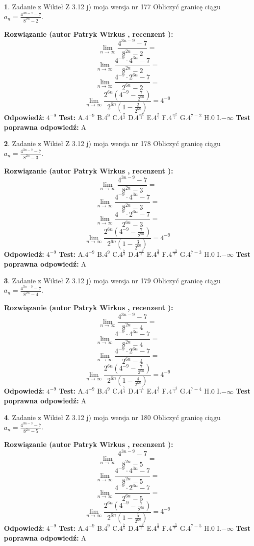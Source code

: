 \documentclass[12pt, a4paper]{article}
\theoremstyle{definition} %
\newtheorem{zad}{}
\newcommand{\zadStart}[1]{\begin{zad}#1\newline}
\newcommand{\zadStop}{\end{zad}}
\newcommand{\rozwStart}[2]{\noindent \textbf{Rozwiązanie (autor #1 , recenzent #2): }\newline}
\newcommand{\rozwStop}{\newline}
\newcommand{\odpStart}{\noindent \textbf{Odpowiedź:}\newline}
\newcommand{\odpStop}{\newline}
\newcommand{\testStart}{\noindent \textbf{Test:}\newline}
\newcommand{\testStop}{\newline}
\newcommand{\kluczStart}{\noindent \textbf{Test poprawna odpowiedź:}\newline}
\newcommand{\kluczStop}{\newline}
\begin{document}
\zadStart{Zadanie z Wikieł Z 3.12 j) moja wersja nr 177}
Obliczyć granicę ciągu $a_{n}=\frac{4^{3n-9}-7}{8^{2n}-2}$.
\zadStop
\rozwStart{Patryk Wirkus}{}
$$\lim\limits_{n\to\infty}\frac{4^{3n-9}-7}{8^{2n}-2}=$$
$$\lim\limits_{n\to\infty}\frac{4^{-9} \cdot 4^{3n}-7}{8^{2n}-2}=$$
$$\lim\limits_{n\to\infty}\frac{4^{-9} \cdot 2^{6n}-7}{2^{6n}-2}=$$
$$\lim\limits_{n\to\infty}\frac{2^{6n}(4^{-9} - \frac{7}{2^{6n}})}{2^{6n}(1-\frac{2}{2^{6n}})}= 4^{-9}$$
\rozwStop
\odpStart
$4^{-9}$
\odpStop
\testStart
A.$4^{-9}$
B.$4^{9}$
C.$4^{\frac{7}{2}}$
D.$4^{\frac{-7}{2}}$
E.$4^{\frac{2}{7}}$
F.$4^{\frac{-2}{7}}$
G.$4^{7-2}$
H.$0$
I.$-\infty$
\testStop
\kluczStart
A
\kluczStop



\zadStart{Zadanie z Wikieł Z 3.12 j) moja wersja nr 178}
Obliczyć granicę ciągu $a_{n}=\frac{4^{3n-9}-7}{8^{2n}-3}$.
\zadStop
\rozwStart{Patryk Wirkus}{}
$$\lim\limits_{n\to\infty}\frac{4^{3n-9}-7}{8^{2n}-3}=$$
$$\lim\limits_{n\to\infty}\frac{4^{-9} \cdot 4^{3n}-7}{8^{2n}-3}=$$
$$\lim\limits_{n\to\infty}\frac{4^{-9} \cdot 2^{6n}-7}{2^{6n}-3}=$$
$$\lim\limits_{n\to\infty}\frac{2^{6n}(4^{-9} - \frac{7}{2^{6n}})}{2^{6n}(1-\frac{3}{2^{6n}})}= 4^{-9}$$
\rozwStop
\odpStart
$4^{-9}$
\odpStop
\testStart
A.$4^{-9}$
B.$4^{9}$
C.$4^{\frac{7}{3}}$
D.$4^{\frac{-7}{3}}$
E.$4^{\frac{3}{7}}$
F.$4^{\frac{-3}{7}}$
G.$4^{7-3}$
H.$0$
I.$-\infty$
\testStop
\kluczStart
A
\kluczStop



\zadStart{Zadanie z Wikieł Z 3.12 j) moja wersja nr 179}
Obliczyć granicę ciągu $a_{n}=\frac{4^{3n-9}-7}{8^{2n}-4}$.
\zadStop
\rozwStart{Patryk Wirkus}{}
$$\lim\limits_{n\to\infty}\frac{4^{3n-9}-7}{8^{2n}-4}=$$
$$\lim\limits_{n\to\infty}\frac{4^{-9} \cdot 4^{3n}-7}{8^{2n}-4}=$$
$$\lim\limits_{n\to\infty}\frac{4^{-9} \cdot 2^{6n}-7}{2^{6n}-4}=$$
$$\lim\limits_{n\to\infty}\frac{2^{6n}(4^{-9} - \frac{7}{2^{6n}})}{2^{6n}(1-\frac{4}{2^{6n}})}= 4^{-9}$$
\rozwStop
\odpStart
$4^{-9}$
\odpStop
\testStart
A.$4^{-9}$
B.$4^{9}$
C.$4^{\frac{7}{4}}$
D.$4^{\frac{-7}{4}}$
E.$4^{\frac{4}{7}}$
F.$4^{\frac{-4}{7}}$
G.$4^{7-4}$
H.$0$
I.$-\infty$
\testStop
\kluczStart
A
\kluczStop



\zadStart{Zadanie z Wikieł Z 3.12 j) moja wersja nr 180}
Obliczyć granicę ciągu $a_{n}=\frac{4^{3n-9}-7}{8^{2n}-5}$.
\zadStop
\rozwStart{Patryk Wirkus}{}
$$\lim\limits_{n\to\infty}\frac{4^{3n-9}-7}{8^{2n}-5}=$$
$$\lim\limits_{n\to\infty}\frac{4^{-9} \cdot 4^{3n}-7}{8^{2n}-5}=$$
$$\lim\limits_{n\to\infty}\frac{4^{-9} \cdot 2^{6n}-7}{2^{6n}-5}=$$
$$\lim\limits_{n\to\infty}\frac{2^{6n}(4^{-9} - \frac{7}{2^{6n}})}{2^{6n}(1-\frac{5}{2^{6n}})}= 4^{-9}$$
\rozwStop
\odpStart
$4^{-9}$
\odpStop
\testStart
A.$4^{-9}$
B.$4^{9}$
C.$4^{\frac{7}{5}}$
D.$4^{\frac{-7}{5}}$
E.$4^{\frac{5}{7}}$
F.$4^{\frac{-5}{7}}$
G.$4^{7-5}$
H.$0$
I.$-\infty$
\testStop
\kluczStart
A
\kluczStop
\end{document}
